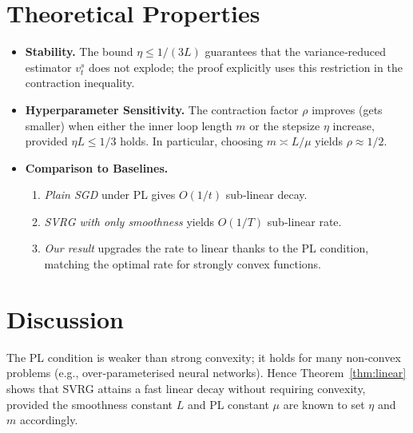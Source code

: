 \documentclass{article}
\begin{document}
\section*{Theoretical Properties}
\begin{itemize}
\item \textbf{Stability.} The bound $\eta\le 1/(3L)$ guarantees that the variance‑reduced estimator $v_{t}^{s}$ does not explode; the proof explicitly uses this restriction in the contraction inequality.
\item \textbf{Hyperparameter Sensitivity.} The contraction factor $\rho$ improves (gets smaller) when either the inner loop length $m$ or the stepsize $\eta$ increase, provided $\eta L\le 1/3$ holds. In particular, choosing $m\asymp L/\mu$ yields $\rho\approx 1/2$.
\item \textbf{Comparison to Baselines.}
    \begin{enumerate}[label=(\alph*)]
        \item \emph{Plain SGD} under PL gives $O(1/t)$ sub‑linear decay.
        \item \emph{SVRG with only smoothness} yields $O(1/T)$ sub‑linear rate.
        \item \emph{Our result} upgrades the rate to linear thanks to the PL condition, matching the optimal rate for strongly convex functions.
    \end{enumerate}
\end{itemize}

\section*{Discussion}
The PL condition is weaker than strong convexity; it holds for many non‑convex problems (e.g., over‑parameterised neural networks). Hence Theorem~\ref{thm:linear} shows that SVRG attains a fast linear decay without requiring convexity, provided the smoothness constant $L$ and PL constant $\mu$ are known to set $\eta$ and $m$ accordingly.

\newpage
\end{document}
